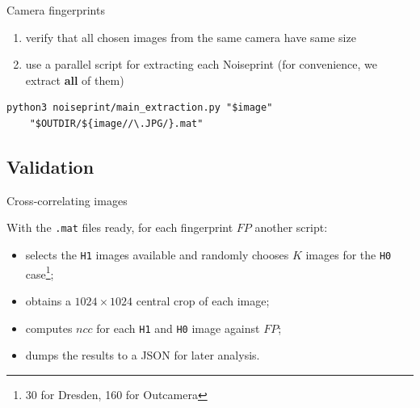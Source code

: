 \begin{frame}[fragile]{Camera fingerprints}

    \begin{enumerate}
        \item verify that all chosen images from the same camera have same size
        \item use a parallel script for extracting each Noiseprint (for convenience, we extract \textbf{all} of them)
    \end{enumerate}
    
    \medskip
    
    \begin{lstlisting}
python3 noiseprint/main_extraction.py "$image"
    "$OUTDIR/${image//\.JPG/}.mat"
    \end{lstlisting}
    
    \medskip
    
    
\end{frame}

\subsection{Validation}

\begin{frame}{Cross-correlating images}

    With the \texttt{.mat} files ready, for each fingerprint $FP$ another script: 
    
    \begin{itemize}
        \item<2-> selects the \texttt{H1} images available and randomly chooses $K$ images for the \texttt{H0} case\footnote{30 for Dresden, 160 for Outcamera};
        \item<3-> obtains a $1024 \times 1024$ central crop of each image;
        \item<4-> computes $ncc$ for each \texttt{H1} and \texttt{H0} image against $FP$;
        \item<5-> dumps the results to a JSON for later analysis.
    \end{itemize}
    
\end{frame}


